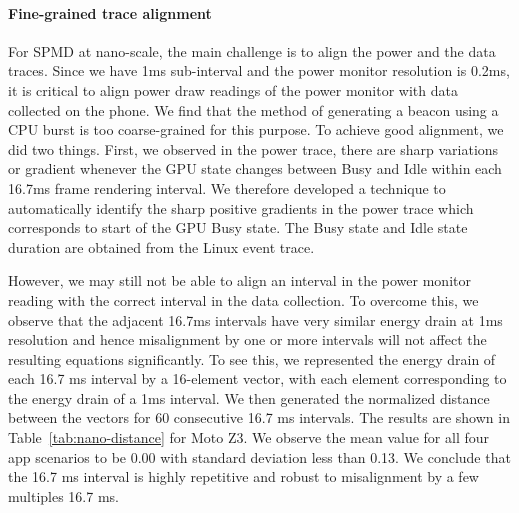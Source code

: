 \paragraph{Fine-grained trace alignment}
For SPMD at nano-scale, the main challenge is to align the power and the data traces. 
Since we have 1ms sub-interval and the power monitor resolution is 0.2ms, it is critical to
align power draw readings of the power monitor with data collected on the phone.
We find that the method of generating a beacon using a CPU burst is too coarse-grained for this purpose. To achieve good alignment, we did two things. 
First, we observed in the power trace, there are sharp variations or gradient whenever the GPU state changes between Busy and Idle within each 16.7ms frame rendering interval. We therefore developed a technique to automatically identify the sharp
positive gradients in the power trace which corresponds to start of the GPU Busy state.
The Busy state and Idle state duration are obtained from the Linux event trace.

However, we may still not be able to align an interval in the power monitor reading with
the correct interval in the data collection. To overcome this,
we observe that the adjacent 16.7ms intervals
have very similar energy drain at 1ms resolution
and hence misalignment by one or more intervals will not affect the resulting equations significantly. 
To see this, we represented the energy drain of each 16.7 ms interval by a 16-element vector, with each element corresponding to the energy drain of a 1ms interval.
We then generated the normalized distance between the vectors 
for 60 consecutive 16.7 ms intervals.
The results are shown in Table~\ref{tab:nano-distance} for Moto Z3.
We observe the mean value for all four app scenarios 
to be 0.00 with standard deviation less than 0.13.
We conclude that the 16.7 ms interval is highly repetitive and robust to misalignment by a few multiples 16.7 ms.

